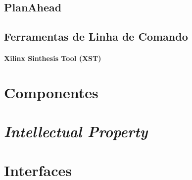 \documentclass[11pt,a4paper,oneside]{book}
\begin{document}
\subsection{PlanAhead}
\subsection{Ferramentas de Linha de Comando}
\paragraph{Xilinx Sinthesis Tool (XST)}


\section{Componentes}
\section{\textit{Intellectual Property}}
\section{Interfaces}

\ifx\compilewholereport\undefined
	 
	\newsavebox\mytempbib\savebox\mytempbib{\parbox{\textwidth}{}}
	\listoftodos
	
\end{document}
